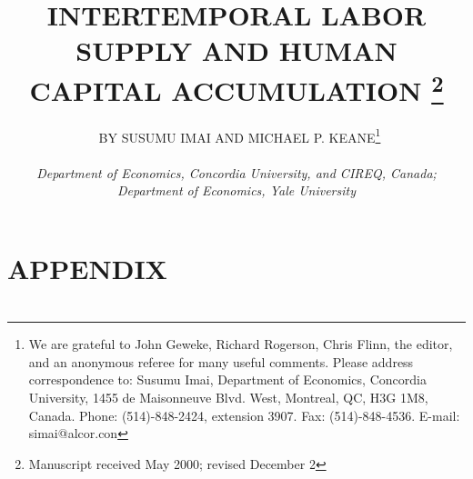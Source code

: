 \documentclass[12pt]{article}
\title{\large \textbf{INTERTEMPORAL LABOR SUPPLY AND HUMAN CAPITAL ACCUMULATION} \thanks{Manuscript received May 2000; revised December 2}}
\author{\normalsize\ BY SUSUMU IMAI AND MICHAEL P. KEANE\footnote{We are grateful to John Geweke, Richard Rogerson, Chris Flinn, the editor, and an anonymous referee for many useful comments. Please address correspondence to: Susumu Imai, Department of Economics, Concordia University, 1455 de Maisonneuve Blvd. West, Montreal, QC, H3G 1M8, Canada. Phone: (514)-848-2424, extension 3907. Fax: (514)-848-4536. E-mail: simai@alcor.con} \\
  \\
  \textit{Department of Economics, Concordia University, and CIREQ, Canada;}\\
  \textit{Department of Economics, Yale University}
}
\date{}
\begin{document}
 

\begin{adjustwidth}{50pt}{50pt}
\maketitle

\begin{abstract}
    
  
\end{abstract}
\end{adjustwidth}
\hspace{0.5cm}














\appendix
\label{appendix}
\section*{APPENDIX}
\cite{MaCurdy1981-iy}

\section*{ }

\section*{ }




\nocite{*}
\end{document}
